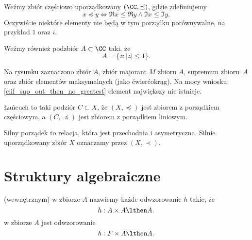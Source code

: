 \begin{example}
    Weźmy zbiór częściowo uporządkowany $(\CC, \preceq)$, gdzie zdefiniujemy
    $$ x \preceq y \iff \Re{x} \leq \Re{y} \wedge \Im{x} \leq \Im{y}. $$
    Oczywiście niektóre elementy nie będą w tym porządku porównywalne, na przykład $1$ oraz $i$.

    Weźmy również podzbiór $A \subset \CC$ taki, że
    $$ A = \{z : |z| \leq 1\}. $$

    Na rysunku zaznaczono \textcolor{MainColor1}{zbiór $A$}, \textcolor{LinkColor1}{zbiór majorant $M$ zbioru $A$}, \textcolor{BoxColor1}{supremum zbioru~$A$} oraz \textcolor{MainColor1}{zbiór elementów maksymalnych} (jako ćwierćokrąg). Na mocy wniosku \ref{c:if_sup_out_then_no_greatest} element największy nie istnieje.

    \begin{center}
    \end{center}
\end{example}

\begin{definition}
    Łańcuch to taki podziór $C \subset X$, że $(X, \preceq)$ jest zbiorem z porządkiem częściowym, a $(C, \preceq)$ jest zbiorem z porządkiem liniowym.
\end{definition}

\begin{definition}
    Silny porządek to relacja, która jest przechodnia i asymetryczna. Silnie uporządkowany zbiór $X$ oznaczamy przez $(X, \prec)$.
\end{definition}

\section{Struktury algebraiczne}
 (wewnętrznym) w zbiorze $A$ nazwiemy każde odwzorowanie $h$ takie, że
$$ h : A \times A \lthen A. $$
 w zbiorze $A$ jest odwzorowanie
$$ h : F \times A \lthen A. $$

